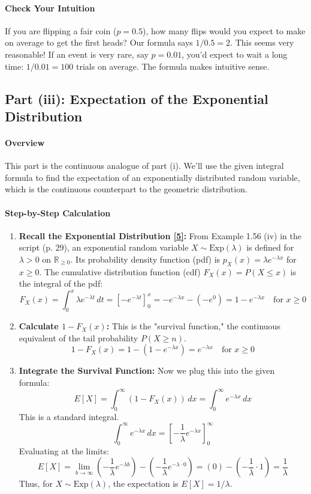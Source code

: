 \documentclass[11pt,a4paper]{article}
\begin{document}
\paragraph{Check Your Intuition}
If you are flipping a fair coin ($p=0.5$), how many flips would you expect to make on average to get the first heads? Our formula says $1/0.5 = 2$. This seems very reasonable! If an event is very rare, say $p=0.01$, you'd expect to wait a long time: $1/0.01 = 100$ trials on average. The formula makes intuitive sense.

\subsection{Part (iii): Expectation of the Exponential Distribution}

\paragraph{Overview}
This part is the continuous analogue of part (i). We'll use the given integral formula to find the expectation of an exponentially distributed random variable, which is the continuous counterpart to the geometric distribution.

\paragraph{Step-by-Step Calculation}
\begin{enumerate}
    \item \textbf{Recall the Exponential Distribution \hyperlink{note_geo_exp}{[5]}:}
    From Example 1.56 (iv) in the script (p. 29), an exponential random variable $X \sim \text{Exp}(\lambda)$ is defined for $\lambda > 0$ on $\mathbb{R}_{\ge 0}$. Its probability density function (pdf) is $p_X(x) = \lambda e^{-\lambda x}$ for $x \ge 0$. The cumulative distribution function (cdf) $F_X(x) = P(X \le x)$ is the integral of the pdf:
    \[
        F_X(x) = \int_0^x \lambda e^{-\lambda t} \,dt = \left[-e^{-\lambda t}\right]_0^x = -e^{-\lambda x} - (-e^0) = 1 - e^{-\lambda x} \quad \text{for } x \ge 0
    \]

    \item \textbf{Calculate $1 - F_X(x)$:}
    This is the "survival function," the continuous equivalent of the tail probability $P(X \ge n)$.
    \[
        1 - F_X(x) = 1 - (1 - e^{-\lambda x}) = e^{-\lambda x} \quad \text{for } x \ge 0
    \]

    \item \textbf{Integrate the Survival Function:}
    Now we plug this into the given formula:
    \[
        E[X] = \int_{0}^{\infty} (1 - F_X(x)) \,dx = \int_{0}^{\infty} e^{-\lambda x} \,dx
    \]
    This is a standard integral.
    \[
        \int_{0}^{\infty} e^{-\lambda x} \,dx = \left[ -\frac{1}{\lambda} e^{-\lambda x} \right]_{0}^{\infty}
    \]
    Evaluating at the limits:
    \[
        E[X] = \lim_{b \to \infty} \left( -\frac{1}{\lambda} e^{-\lambda b} \right) - \left( -\frac{1}{\lambda} e^{-\lambda \cdot 0} \right) = (0) - \left( -\frac{1}{\lambda} \cdot 1 \right) = \frac{1}{\lambda}
    \]
    Thus, for $X \sim \text{Exp}(\lambda)$, the expectation is $\boxed{E[X] = 1/\lambda}$.
\end{enumerate}
\end{document}
